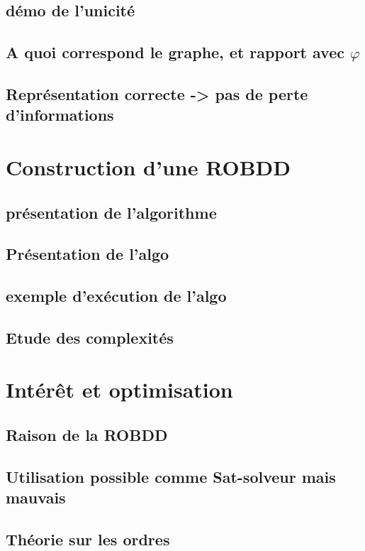\documentclass[a4paper, oneside]{report}
\begin{document}
\section{démo de l'unicité}
\section{A quoi correspond le graphe, et rapport avec $\varphi$}
\section{Représentation correcte -> pas de perte d'informations}

\chapter{Construction d'une ROBDD}

\section{présentation de l'algorithme}
\section{Présentation de l'algo}
\section{exemple d'exécution de l'algo}
\section{Etude des complexités}

\chapter{Intérêt et optimisation}

\section{Raison de la ROBDD}
\section{Utilisation possible comme Sat-solveur mais mauvais}
\section{Théorie sur les ordres}
\end{document}
